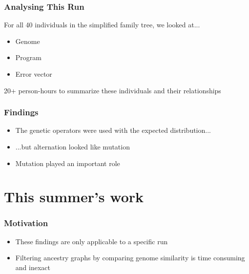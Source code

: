 \documentclass{beamer}
\begin{document}
   \begin{frame}
     \frametitle{Analysing This Run}
     For all 40 individuals in the simplified family tree, we looked at...
     \begin{itemize}
     \item Genome
     \item Program
     \item Error vector
     \end{itemize}
     20+ person-hours to summarize these individuals and their relationships
   \end{frame}

   \begin{frame}
     \frametitle{Findings}
     \begin{itemize}
     \item The genetic operators were used with the expected distribution...
     \item ...but alternation looked like mutation
     \item Mutation played an important role
     \end{itemize}
   \end{frame} 
   
\section{This summer's work}

   \begin{frame}
     \frametitle{Motivation}
     \begin{itemize}
     \item These findings are only applicable to a specific run
     \item Filtering ancestry graphs by comparing genome similarity is time consuming and inexact
     \end{itemize}
   \end{frame}
\end{document}
